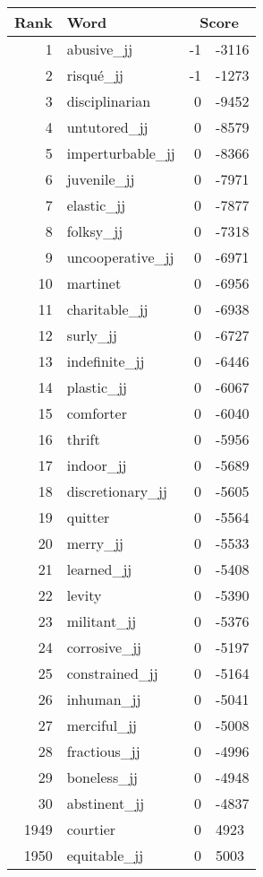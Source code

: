 \begin{longtable}[!htbp]{| rlr@{.}l |}
    \hline
    \textbf{Rank} & \textbf{Word} & \multicolumn{2}{c|}{\textbf{Score}} \\
    \hline
    \endhead
    1 & abusive\_jj & -1 & -3116 \\
    2 & risqué\_jj & -1 & -1273 \\
    3 & disciplinarian & 0 & -9452 \\
    4 & untutored\_jj & 0 & -8579 \\
    5 & imperturbable\_jj & 0 & -8366 \\
    6 & juvenile\_jj & 0 & -7971 \\
    7 & elastic\_jj & 0 & -7877 \\
    8 & folksy\_jj & 0 & -7318 \\
    9 & uncooperative\_jj & 0 & -6971 \\
    10 & martinet & 0 & -6956 \\
    11 & charitable\_jj & 0 & -6938 \\
    12 & surly\_jj & 0 & -6727 \\
    13 & indefinite\_jj & 0 & -6446 \\
    14 & plastic\_jj & 0 & -6067 \\
    15 & comforter & 0 & -6040 \\
    16 & thrift & 0 & -5956 \\
    17 & indoor\_jj & 0 & -5689 \\
    18 & discretionary\_jj & 0 & -5605 \\
    19 & quitter & 0 & -5564 \\
    20 & merry\_jj & 0 & -5533 \\
    21 & learned\_jj & 0 & -5408 \\
    22 & levity & 0 & -5390 \\
    23 & militant\_jj & 0 & -5376 \\
    24 & corrosive\_jj & 0 & -5197 \\
    25 & constrained\_jj & 0 & -5164 \\
    26 & inhuman\_jj & 0 & -5041 \\
    27 & merciful\_jj & 0 & -5008 \\
    28 & fractious\_jj & 0 & -4996 \\
    29 & boneless\_jj & 0 & -4948 \\
    30 & abstinent\_jj & 0 & -4837 \\
    1949 & courtier & 0 & 4923 \\
    1950 & equitable\_jj & 0 & 5003 \\

\end{longtable}
